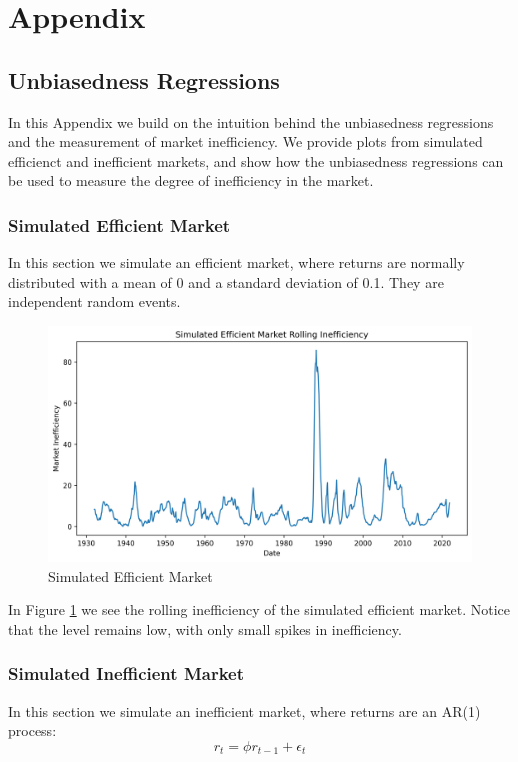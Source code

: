 \section{Appendix}
\label{sec:appendix}

\subsection{Unbiasedness Regressions}
In this Appendix we build on the intuition behind the unbiasedness regressions and the measurement of market inefficiency.
We provide plots from simulated efficienct and inefficient markets, and show how the unbiasedness regressions can be used to measure the degree of inefficiency in the market.

\subsubsection{Simulated Efficient Market}
In this section we simulate an efficient market, where returns are normally distributed with a mean of 0 and a standard deviation of 0.1.
They are independent random events.

\begin{figure}[h]
    \centering
    \includegraphics[width=1\textwidth]{../figs/Simulated Efficient Market Rolling Inefficiency.png}
    \caption{Simulated Efficient Market}
    \label{fig:efficient_market}
\end{figure}

In Figure \ref{fig:efficient_market} we see the rolling inefficiency of the simulated efficient market.
Notice that the level remains low, with only small spikes in inefficiency.

\subsubsection{Simulated Inefficient Market}
In this section we simulate an inefficient market, where returns are an AR(1) process:
\begin{equation}
    r_t = \phi r_{t-1} + \epsilon_t
\end{equation}


